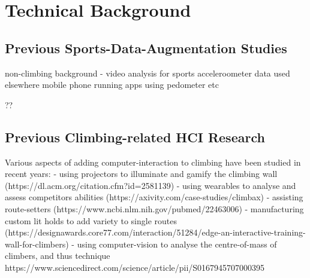 \chapter{Technical Background}
\label{chap:technical}





\noindent

\section{Previous Sports-Data-Augmentation Studies}


non-climbing background
- video analysis for sports
acceleroometer data used elsewhere
mobile phone running apps using pedometer etc

??


\section{Previous Climbing-related HCI Research}


Various aspects of adding computer-interaction to climbing have been studied in recent years: - using projectors to illuminate and gamify the climbing wall (https://dl.acm.org/citation.cfm?id=2581139) - using wearables to analyse and assess competitors abilities (https://axivity.com/case-studies/climbax) - assisting route-setters (https://www.ncbi.nlm.nih.gov/pubmed/22463006) - manufacturing custom lit holds to add variety to single routes (https://designawards.core77.com/interaction/51284/edge-an-interactive-training-wall-for-climbers) - using computer-vision to analyse the centre-of-mass of climbers, and thus technique https://www.sciencedirect.com/science/article/pii/S0167945707000395


